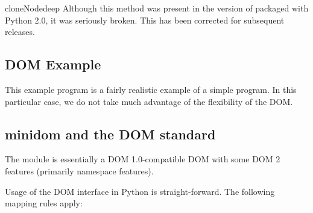 \begin{methoddesc}{cloneNode}{deep}
Although this method was present in the version of
 packaged with Python 2.0, it was seriously
broken.  This has been corrected for subsequent releases.
\end{methoddesc}


\subsection{DOM Example \label{dom-example}}

This example program is a fairly realistic example of a simple
program. In this particular case, we do not take much advantage
of the flexibility of the DOM.




\subsection{minidom and the DOM standard \label{minidom-and-dom}}

The  module is essentially a DOM
1.0-compatible DOM with some DOM 2 features (primarily namespace
features).

Usage of the DOM interface in Python is straight-forward.  The
following mapping rules apply:

